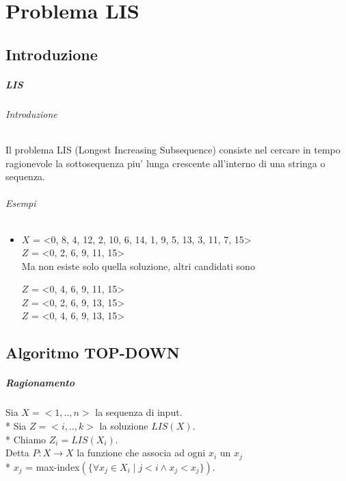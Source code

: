 \chapter{Problema LIS}

\section{Introduzione}

\paragraph{LIS}

\subparagraph{Introduzione}

Il problema LIS (Longest Increasing Subsequence) consiste nel cercare in tempo ragionevole la sottosequenza piu' lunga crescente all'interno di una stringa o sequenza.

\subparagraph{Esempi}

\begin{itemize}

\item

$X$ = <0, 8, 4, 12, 2, 10, 6, 14, 1, 9, 5, 13, 3, 11, 7, 15> \\
$Z$ = <0, 2, 6, 9, 11, 15> \\

Ma non esiste solo quella soluzione, altri candidati sono

$Z$ = <0, 4, 6, 9, 11, 15> \\
$Z$ = <0, 2, 6, 9, 13, 15> \\
$Z$ = <0, 4, 6, 9, 13, 15> \\

\end{itemize}

\section{Algoritmo TOP-DOWN}

\paragraph{Ragionamento}

Sia $X = <1,..,n>$ la sequenza di input. \\*
Sia $Z = <i,..,k>$ la soluzione $LIS(X)$. \\*
Chiamo $Z_i = LIS(X_i)$. \\

Detta $P : X \rightarrow X$ la funzione che associa ad ogni $x_i$ un $x_j$ \\*
$x_j$ = max-index$(\{\forall x_j \in X_i \mid j < i \land x_j < x_j\})$. \\


